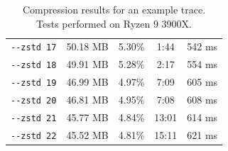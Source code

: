 \documentclass[hidelinks,titlepage,a4paper]{article}
\begin{document}
\begin{table}[h]
\begin{tabular}[h]{c|c|c|c|c}
\texttt{-{}-zstd 17} & 50.18 MB & 5.30\% & 1:44 & 542 \si{\milli\second} \\
\texttt{-{}-zstd 18} & 49.91 MB & 5.28\% & 2:17 & 554 \si{\milli\second} \\
\texttt{-{}-zstd 19} & 46.99 MB & 4.97\% & 7:09 & 605 \si{\milli\second} \\
\texttt{-{}-zstd 20} & 46.81 MB & 4.95\% & 7:08 & 608 \si{\milli\second} \\
\texttt{-{}-zstd 21} & 45.77 MB & 4.84\% & 13:01 & 614 \si{\milli\second} \\
\texttt{-{}-zstd 22} & 45.52 MB & 4.81\% & 15:11 & 621 \si{\milli\second}
\end{tabular}
\caption{Compression results for an example trace. \\ Tests performed on Ryzen 9 3900X.}
\label{compressiontimes}
\end{table}
\end{document}
